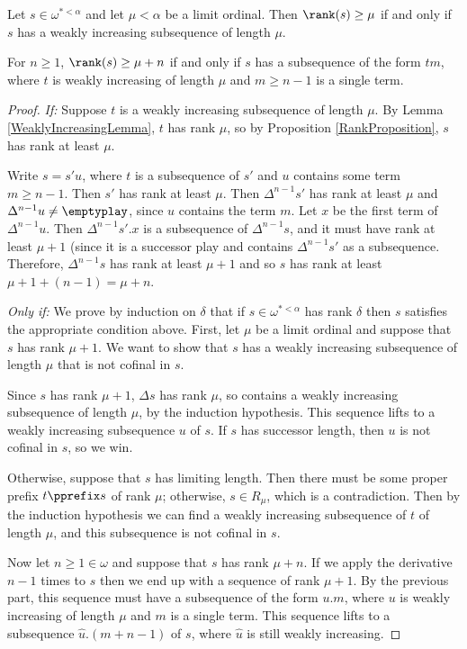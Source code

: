 \documentclass[11pt]{article} %
\begin{document}
\begin{theorem}
  Let $s\in\omega^{*<\alpha}$ and let $\mu<\alpha$ be a limit ordinal.  Then $\rank(s)\ge\mu$ if and only if $s$ has a weakly increasing subsequence of length $\mu$.  

  For $n\ge 1$, $\rank(s)\ge\mu+n$ if and only if $s$ has a subsequence of the form $tm$, where $t$ is weakly increasing of length $\mu$ and $m\ge n-1$ is a single term.

  \begin{proof}
    \emph{If: } Suppose $t$ is a weakly increasing subsequence of length $\mu$.  By Lemma \ref{WeaklyIncreasingLemma}, $t$ has rank $\mu$, so by Proposition \ref{RankProposition}, $s$ has rank at least $\mu$.  

    Write $s=s'u$, where $t$ is a subsequence of $s'$ and $u$ contains some term $m\ge n-1$.  Then $s'$ has rank at least $\mu$.  Then $\Delta^{n-1} s'$ has rank at least $\mu$ and $\Delta^{n-1}u\ne\emptyplay$, since $u$ contains the term $m$.  Let $x$ be the first term of $\Delta^{n-1}u$.  Then $\Delta^{n-1}s'.x$ is a subsequence of $\Delta^{n-1}s$, and it must have rank at least $\mu+1$ (since it is a successor play and contains $\Delta^{n-1}s'$ as a subsequence.  Therefore, $\Delta^{n-1}s$ has rank at least $\mu+1$ and so $s$ has rank at least $\mu+1+(n-1)=\mu+n$.  

    \emph{Only if: } We prove by induction on $\delta$ that if $s\in\omega^{*<\alpha}$ has rank $\delta$ then $s$ satisfies the appropriate condition above.  First, let $\mu$ be a limit ordinal and suppose that $s$ has rank $\mu+1$.  We want to show that $s$ has a weakly increasing subsequence of length $\mu$ that is not cofinal in $s$.  

    Since $s$ has rank $\mu+1$, $\Delta s$ has rank $\mu$, so contains a weakly increasing subsequence of length $\mu$, by the induction hypothesis.  This sequence lifts to a weakly increasing subsequence $u$ of $s$.  If $s$ has successor length, then $u$ is not cofinal in $s$, so we win.  

    Otherwise, suppose that $s$ has limiting length.  Then there must be some proper prefix $t\pprefix s$ of rank $\mu$; otherwise, $s\in R_\mu$, which is a contradiction.  Then by the induction hypothesis we can find a weakly increasing subsequence of $t$ of length $\mu$, and this subsequence is not cofinal in $s$.  

    Now let $n\ge1\in\omega$ and suppose that $s$ has rank $\mu+n$.  If we apply the derivative $n-1$ times to $s$ then we end up with a sequence of rank $\mu+1$.  By the previous part, this sequence must have a subsequence of the form $u.m$, where $u$ is weakly increasing of length $\mu$ and $m$ is a single term.  This sequence lifts to a subsequence $\hat u.(m+n-1)$ of $s$, where $\hat u$ is still weakly increasing.  


\end{proof}
\end{theorem}
\end{document}
